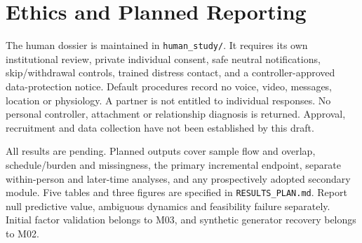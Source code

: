 \section{Ethics and Planned Reporting}

The human dossier is maintained in \texttt{human\_study/}. It requires its own institutional review, private individual consent, safe neutral notifications, skip/withdrawal controls, trained distress contact, and a controller-approved data-protection notice. Default procedures record no voice, video, messages, location or physiology. A partner is not entitled to individual responses. No personal controller, attachment or relationship diagnosis is returned. Approval, recruitment and data collection have not been established by this draft.

All results are pending. Planned outputs cover sample flow and overlap, schedule/burden and missingness, the primary incremental endpoint, separate within-person and later-time analyses, and any prospectively adopted secondary module. Five tables and three figures are specified in \texttt{RESULTS\_PLAN.md}. Report null predictive value, ambiguous dynamics and feasibility failure separately. Initial factor validation belongs to M03, and synthetic generator recovery belongs to M02.
